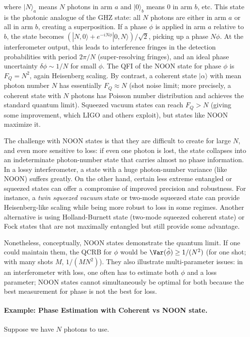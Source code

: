 where $|N\rangle_a$ means $N$ photons in arm $a$ and $|0\rangle_b$
means 0 in arm $b$, etc. This state is the photonic analogue of the
GHZ state: all $N$ photons are either in arm $a$ or all in arm $b$,
creating a superposition. If a phase $\phi$ is applied in arm $a$
relative to $b$, the state becomes $(|N,0\rangle + e^{-i N
  \phi}|0,N\rangle)/\sqrt{2}$, picking up a phase $N\phi$. At the
interferometer output, this leads to interference fringes in the
detection probabilities with period $2\pi/N$ (super-resolving
fringes), and an ideal phase uncertainty $\delta\phi \sim 1/N$ for
small $\phi$. The QFI of the NOON state for phase $\phi$ is $F_Q =
N^2$, again Heisenberg scaling. By contrast, a coherent state
$|\alpha\rangle$ with mean photon number $N$ has essentially $F_Q
\approx N$ (shot noise limit; more precisely, a coherent state with
$N$ photons has Poisson number distribution and achieves the standard
quantum limit). Squeezed vacuum states can reach $F_Q > N$ (giving
some improvement, which LIGO and others exploit), but states like NOON
maximize it.



The challenge with NOON states is that they are difficult to create
for large $N$, and even more sensitive to loss: if even one photon is
lost, the state collapses into an indeterminate photon-number state
that carries almost no phase information. In a lossy interferometer, a
state with a huge photon-number variance (like NOON) suffers
greatly. On the other hand, certain less extreme entangled or squeezed
states can offer a compromise of improved precision and
robustness. For instance, a \emph{twin squeezed vacuum} state or
two-mode squeezed state can provide Heisenberg-like scaling while
being more robust to loss in some regimes. Another alternative is
using Holland-Burnett state (two-mode squeezed coherent state) or Fock
states that are not maximally entangled but still provide some
advantage.



Nonetheless, conceptually, NOON states demonstrate the quantum
limit. If one could maintain them, the QCRB for $\phi$ would be
$\Var(\hat{\phi}) \ge 1/(N^2)$ (for one shot; with many shots $M$,
$1/(M N^2)$). They also illustrate multi-parameter issues: in an
interferometer with loss, one often has to estimate both $\phi$ and a
loss parameter; NOON states cannot simultaneously be optimal for both
because the best measurement for phase is not the best for loss.



\paragraph{Example: Phase Estimation with Coherent vs NOON state.} Suppose we have $N$ photons to use.



